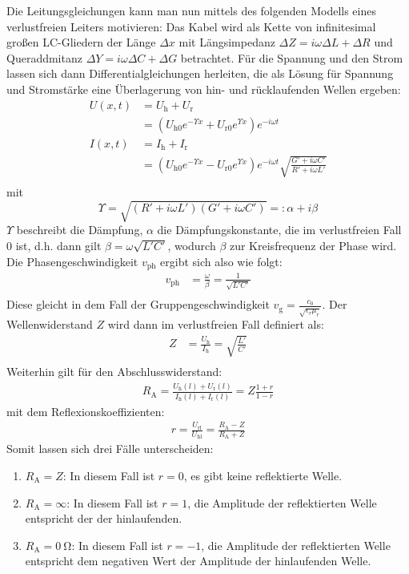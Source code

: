 \documentclass[ngerman]{scrartcl}
\theoremstyle{definition}
\begin{document}
		Die Leitungsgleichungen kann man nun mittels des folgenden Modells eines verlustfreien Leiters motivieren: Das Kabel wird als Kette von infinitesimal großen LC-Gliedern der Länge $\Delta x$ mit Längsimpedanz $\Delta Z = i \omega \Delta L + \Delta R$ und Queraddmitanz $\Delta Y = i \omega \Delta C + \Delta G$ betrachtet.
		Für die Spannung und den Strom lassen sich dann Differentialgleichungen herleiten, die als Lösung für Spannung und Stromstärke eine Überlagerung von hin- und rücklaufenden Wellen ergeben:
		\begin{align*}
			U(x,t) &= U_\mathrm{h} + U_\mathrm{r} \\
			&= (U_\mathrm{h0} e^{-\Upsilon x} + U_\mathrm{r0} e^{\Upsilon x}) e^{-i \omega t} \\
			I(x,t) &= I_\mathrm{h} + I_\mathrm{r} \\
			&= (U_\mathrm{h0} e^{-\Upsilon x} - U_\mathrm{r0} e^{\Upsilon x}) e^{-i \omega t} \sqrt{\frac{G' + i \omega C'}{R' + i \omega L'}} \\
		\end{align*}
		mit 
		\begin {equation*}
			\Upsilon = \sqrt{(R' + i \omega L')(G' + i \omega C')} =: \alpha + i \beta 
		\end{equation*}
		$\Upsilon$ beschreibt die Dämpfung, $\alpha$ die Dämpfungskonstante, die im verlustfreien Fall $0$ ist, d.h. dann gilt $\beta = \omega \sqrt{L'C'}$, wodurch $\beta$ zur Kreisfrequenz der Phase wird. Die Phasengeschwindigkeit $v_\mathrm{ph}$ ergibt sich also wie folgt:
		\begin{align*}
			v_\mathrm{ph} &= \frac{\omega}{\beta} = \frac{1}{\sqrt{L'C'}} \\
		\end{align*}
		Diese gleicht in dem Fall der Gruppengeschwindigkeit $v_\mathrm{g} = \frac{c_0}{\sqrt{\epsilon_r \mu_r}}$.
		Der Wellenwiderstand $Z$ wird dann im verlustfreien Fall definiert als:
		\begin{align*}
			Z &= \frac{U_\mathrm{h}}{I_\mathrm{h}} = \sqrt{\frac{L'}{C'}} \\ 
		\end{align*}
		Weiterhin gilt für den Abschlusswiderstand: 
		\begin{align*}
    		R_\mathrm{A}=\frac{U_\mathrm{h}(l)+U_\mathrm{r}(l)}{I_\mathrm{h}(l)+I_\mathrm{r}(l)}=Z\frac{1+r}{1-r}
		\end{align*}
		mit dem Reflexionskoeffizienten: 
		\begin{align*}
    		r = \frac{U_\mathrm{rl}}{U_\mathrm{hl}} = \frac{R_\mathrm{A}-Z}{R_\mathrm{A}+Z}
		\end{align*}
		Somit lassen sich drei Fälle unterscheiden:
		\begin{enumerate}
			\item $R_\mathrm{A} = Z$: In diesem Fall ist $r=0$, es gibt keine reflektierte Welle.
			\item $R_\mathrm{A} = \infty$: In diesem Fall ist $r=1$, die Amplitude der reflektierten Welle entspricht der der hinlaufenden.
			\item $R_\mathrm{A} = \SI{0}{\ohm}$: In diesem Fall ist $r=-1$, die Amplitude der reflektierten Welle entspricht dem negativen Wert der Amplitude der hinlaufenden Welle.
		\end{enumerate}
\end{document}
